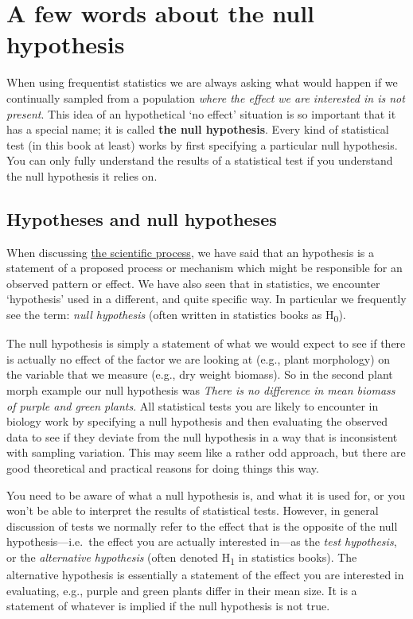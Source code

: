 \documentclass[]{book}
\begin{document}
\section{A few words about the null
hypothesis}\label{a-few-words-about-the-null-hypothesis}

When using frequentist statistics we are always asking what would happen
if we continually sampled from a population \emph{where the effect we
are interested in is not present}. This idea of an hypothetical `no
effect' situation is so important that it has a special name; it is
called \textbf{the null hypothesis}. Every kind of statistical test (in
this book at least) works by first specifying a particular null
hypothesis. You can only fully understand the results of a statistical
test if you understand the null hypothesis it relies on.

\subsection{Hypotheses and null
hypotheses}\label{hypotheses-and-null-hypotheses}

When discussing \protect\hyperlink{stages-hypotheses}{the scientific
process}, we have said that an hypothesis is a statement of a proposed
process or mechanism which might be responsible for an observed pattern
or effect. We have also seen that in statistics, we encounter
`hypothesis' used in a different, and quite specific way. In particular
we frequently see the term: \emph{null hypothesis} (often written in
statistics books as H\textsubscript{0}).

The null hypothesis is simply a statement of what we would expect to see
if there is actually no effect of the factor we are looking at (e.g.,
plant morphology) on the variable that we measure (e.g., dry weight
biomass). So in the second plant morph example our null hypothesis was
\emph{There is no difference in mean biomass of purple and green
plants}. All statistical tests you are likely to encounter in biology
work by specifying a null hypothesis and then evaluating the observed
data to see if they deviate from the null hypothesis in a way that is
inconsistent with sampling variation. This may seem like a rather odd
approach, but there are good theoretical and practical reasons for doing
things this way.

You need to be aware of what a null hypothesis is, and what it is used
for, or you won't be able to interpret the results of statistical tests.
However, in general discussion of tests we normally refer to the effect
that is the opposite of the null hypothesis---i.e.~the effect you are
actually interested in---as the \emph{test hypothesis}, or the
\emph{alternative hypothesis} (often denoted H\textsubscript{1} in
statistics books). The alternative hypothesis is essentially a statement
of the effect you are interested in evaluating, e.g., purple and green
plants differ in their mean size. It is a statement of whatever is
implied if the null hypothesis is not true.
\end{document}
